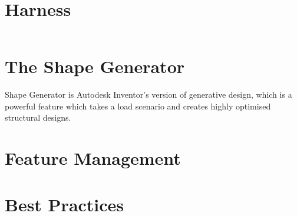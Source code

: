$ $

\section{Harness}

$ $

\section{The Shape Generator}
Shape Generator is Autodesk Inventor's version of generative design, which is a powerful feature which takes a load scenario and creates highly optimised structural designs.

\section{Feature Management}

\section{Best Practices}